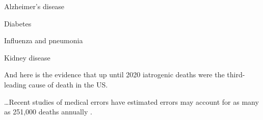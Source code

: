 \begin{refsection}
\begin{tcolorbox}[quote]
Alzheimer's disease

Diabetes

Influenza and pneumonia

Kidney disease\textsuperscript{\cite{url10239uydn}}

\end{tcolorbox}

And here is the evidence that up until 2020 iatrogenic deaths were the third-leading cause of death in the US.\textsuperscript{\cite{url91823hbw, url218903ha}}

\begin{tcolorbox}[quote]

\dots{}Recent studies of medical errors have estimated errors may account for as many as 251,000 deaths annually .\textsuperscript{\cite{url0123hone}}

\end{tcolorbox}

\printbibliography[heading=subbibliography]

\end{refsection}